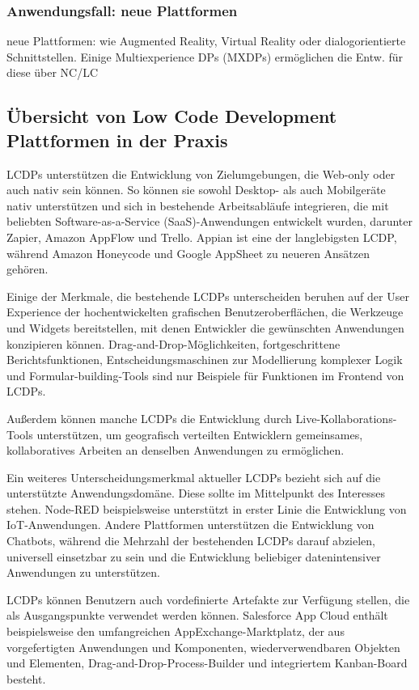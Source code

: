 \documentclass[12pt]{article} %
\begin{document}
	\subsubsection{Anwendungsfall: neue Plattformen}
	neue Plattformen: wie Augmented Reality, Virtual Reality oder dialogorientierte Schnittstellen. Einige Multiexperience DPs (MXDPs) ermöglichen die Entw. für diese über NC/LC 
	
	
	\subsection{Übersicht von Low Code Development Plattformen in der Praxis}	
	LCDPs unterstützen die Entwicklung von Zielumgebungen, die Web-only oder auch nativ sein können. So können sie sowohl Desktop- als auch Mobilgeräte nativ unterstützen und sich in bestehende Arbeitsabläufe integrieren, die mit beliebten Software-as-a-Service (SaaS)-Anwendungen entwickelt wurden, darunter Zapier, Amazon AppFlow und Trello. Appian ist eine der langlebigsten LCDP, während Amazon Honeycode und Google AppSheet zu neueren Ansätzen gehören. \cite{DiRuscio.2022}
	
	Einige der Merkmale, die bestehende LCDPs unterscheiden beruhen auf der User Experience der hochentwickelten grafischen Benutzeroberflächen, die Werkzeuge und Widgets bereitstellen, mit denen Entwickler die gewünschten Anwendungen konzipieren können. Drag-and-Drop-Möglichkeiten, fortgeschrittene Berichtsfunktionen, Entscheidungsmaschinen zur Modellierung komplexer Logik und Formular-building-Tools sind nur Beispiele für Funktionen im Frontend von LCDPs. \cite{DiRuscio.2022}
	
	Außerdem können manche LCDPs die Entwicklung durch Live-Kollaborations-Tools unterstützen, um geografisch verteilten Entwicklern gemeinsames, kollaboratives Arbeiten an denselben Anwendungen zu ermöglichen. \cite{DiRuscio.2022}
	
	Ein weiteres Unterscheidungsmerkmal aktueller LCDPs bezieht sich auf die unterstützte Anwendungsdomäne. Diese sollte im Mittelpunkt des Interesses stehen. Node-RED beispielsweise unterstützt in erster Linie die Entwicklung von IoT-Anwendungen. Andere Plattformen unterstützen die Entwicklung von Chatbots, während die Mehrzahl der bestehenden LCDPs darauf abzielen, universell einsetzbar zu sein und die Entwicklung beliebiger datenintensiver Anwendungen zu unterstützen. \cite{DiRuscio.2022}
	
	LCDPs können Benutzern auch vordefinierte Artefakte zur Verfügung stellen, die als Ausgangspunkte verwendet werden können. Salesforce App Cloud enthält beispielsweise den umfangreichen AppExchange-Marktplatz, der aus vorgefertigten Anwendungen und Komponenten, wiederverwendbaren Objekten und Elementen, Drag-and-Drop-Process-Builder und integriertem Kanban-Board besteht. \cite{DiRuscio.2022}
	
\end{document}
